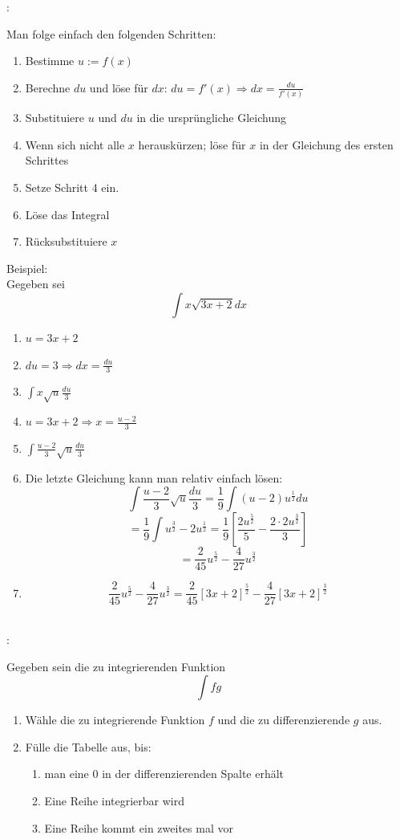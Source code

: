 \documentclass[7pt,landscape, margin = 0.1mm]{article}
\newcommand{\KRZ}[2]{\vspace{1mm} \hline \vspace{1mm} \color{chaptercolor}{RC #1}:\color{black} \   \hspace{0.2cm}\vspace{1mm}   {\begin{minipage}{20em}
#2 \end{minipage}} \vspace{1mm}  \hline \vspace{1mm}  \\}
\begin{document}
\begin{multicols}{4}
\KRZ{Unbestimmtes Integral mit Substitution}{
Man folge einfach den folgenden Schritten:
\begin{enumerate}
\item Bestimme $u := f(x)$
\item Berechne $du$ und löse für $dx$: $du = f'(x) \Rightarrow dx = \frac{du}{f'(x)}$
\item Substituiere $u$ und $du$ in die ursprüngliche Gleichung
\item Wenn sich nicht alle $x$ herauskürzen; löse für $x$ in der Gleichung des ersten Schrittes
\item Setze Schritt 4 ein.
\item Löse das Integral
\item Rücksubstituiere $x$
\end{enumerate}
Beispiel:\\
Gegeben sei $$\int x \sqrt{3x+2}dx$$
\begin{enumerate}
\item $u = 3x + 2$
\item $du = 3 \Rightarrow dx = \frac{du}{3}$
\item $\int x \sqrt{u} \frac{du}{3}$
\item $u = 3x + 2 \Rightarrow x = \frac{u-2}{3} $
\item $\int \frac{u-2}{3}\sqrt{u} \frac{du}{3}  $
\item
Die letzte Gleichung kann man relativ einfach lösen:
$$ \int \frac{u-2}{3}\sqrt{u} \frac{du}{3}   = \frac{1}{9} \int \left( u-2 \right) u^{\frac{1}{2}} du$$
$$ = \frac{1}{9} \int u^{\frac{3}{2}} - 2 u^{\frac{1}{2}} = \frac{1}{9} \left[\frac{2u^{\frac{5}{2}}}{5} - \frac{2 \cdot 2u^{\frac{3}{2}}}{3}\right]$$
$$ = \frac{2}{45}u^{\frac{5}{2}}-\frac{4}{27}u^{\frac{3}{2}}$$
\item 
$$  \frac{2}{45}u^{\frac{5}{2}}-\frac{4}{27}u^{\frac{3}{2}} = \frac{2}{45} \left[3x+2 \right]^{\frac{5}{2}}-\frac{4}{27}\left[3x+2 \right]^{\frac{3}{2}}$$
\end{enumerate}
}
\KRZ{Partielle Integration: DI-Methode}{
Gegeben sein die zu integrierenden Funktion $$\int f g$$
\begin{enumerate}
\item Wähle die zu integrierende Funktion $f$ und die zu differenzierende $g$ aus.
\item Fülle die Tabelle aus, bis:
\begin{enumerate}
\item man eine $0$ in der differenzierenden Spalte erhält
\item Eine Reihe integrierbar wird
\item Eine Reihe kommt ein zweites mal vor
\end{enumerate}
\begin{center}


\end{center}
\end{enumerate}}
\end{multicols}
\end{document}
